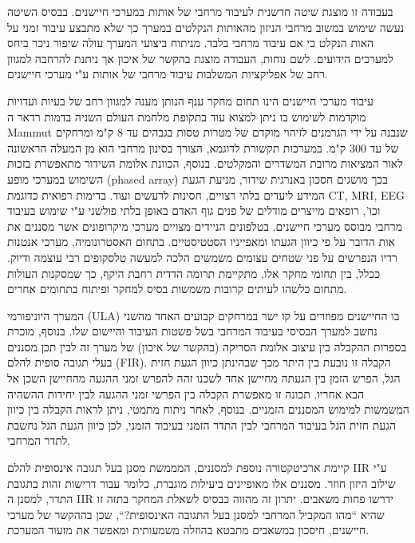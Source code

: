 בעבודה זו מוצגת שיטה חדשנית לעיבוד מרחבי של אותות במערכי חיישנים.
בבסיס השיטה נעשה שימוש במשוב מרחבי הניזון מהאותות הנקלטים במערך כך שלא מתבצע עיבוד זמני על האות הנקלט כי אם עיבוד מרחבי בלבד.
מניתוח ביצועי המערך עולה שיפור ניכר ביחס למערכים הידועים.
לשם נוחות, העבודה מוצגת בהקשר של איכון אך ניתנת להרחבה למגוון רחב של אפליקציות המשלבות עיבוד מרחבי של אותות ע"י מערכי חיישנים. 
\par
עיבוד מערכי חיישנים הינו תחום מחקר ענף הנותן מענה למגוון רחב של בעיות ועדויות מוקדמות לשימוש בו ניתן למצוא עוד בתקופת מלחמת העולם השניה בדמות רדאר ה
\textenglish{Mammut}
שנבנה על ידי הגרמנים לזיהוי מוקדם של מטרות טסות בגבהים עד 8 ק"מ ומרחקים של עד 300 ק"מ.
במערכות תקשורת לדוגמא, הצורך בסינון מרחבי הוא מן המעלה הראשונה לאור המציאות מרובת המשדרים והמקלטים. בנוסף, הכוונת אלומת השידור מתאפשרת בזכות השימוש במערכי מופע
\textenglish{(phased array)}
בכך מושגים חסכון באנרגית שידור, מניעת הגעת המידע ליעדים בלתי רצויים, חסינות לרעשים ועוד.
בדימות רפואית כדוגמת 
\textenglish{CT, MRI, EEG}
וכו', רופאים מייצרים מודלים של פנים גוף האדם באופן בלתי פולשני ע"י שימוש בעיבוד מרחבי מבוסס מערכי חיישנים.
בטלפונים הניידים מצויים מערכי מיקרופונים אשר מסננים את אות הדובר על פי כיוון הגעתו ומאפייניו הסטטיסטיים.
בתחום האסטרונומיה, מערכי אנטנות רדיו הנפרשים על פני שטחים עצומים משמשים הלכה למעשה טלסקופים רבי עוצמה ודיוק.
ככלל, בין תחומי מחקר אלו, מתקיימת תרומה הדדית רחבת היקף, כך שמסקנות העולות מתחום כלשהו לעיתים קרובות משמשות בסיס למחקר ופיתוח בתחומים אחרים.
\par
המערך היוניפורמי
\textenglish{(ULA)}
בו החיישנים מפוזרים על קו ישר במרחקים קבועים האחד מהשני נחשב למערך הבסיסי בעיבוד המרחבי בשל פשטות העיבוד והיישום שלו.
בנוסף, מוכרת בספרות ההקבלה בין עיצוב אלומת הסריקה (בהקשר של איכון) של מערך זה לבין תכן מסננים בעלי תגובה סופית להלם
\textenglish{(FIR)}.
הקבלה זו נובעת בין היתר מכך שבהינתן כיוון הגעת חזית הגל, הפרש הזמן בין הגעתה מחיישן אחד לשכנו זהה להפרש זמני ההגעה מהחיישן השכן אל הבא אחריו. תכונה זו מאפשרת הקבלה בין הפרשי זמני ההגעה לבין יחידות ההשהיה המשמשות למימוש המסננים הזמניים.
בנוסף, לאחר ניתוח מתמטי, ניתן לראות הקבלה בין כיוון הגעת חזית הגל בעיבוד המרחבי לבין התדר הזמני בעיבוד הזמני, לכן כיוון הגעת הגל נחשבת לתדר המרחבי.
\par
קיימת ארכיטקטורה נוספת למסננים, המממשת מסנן בעל תגובה אינסופית להלם 
\textenglish{IIR}
ע"י שילוב היזון חוזר.
מסננים אלו מאופיינים ביעילות מוגברת, כלומר עבור דרישות זהות בתגובת התדר, למסנן ה
\textenglish{IIR}
ידרשו פחות משאבים.
יתרון זה מהווה כבסיס לשאלת המחקר בתזה זו שהיא 
``מהו המקביל המרחבי למסנן בעל התגובה האינסופית?``, שכן בההקשר של מערכי חיישנים, חיסכון במשאבים מתבטא בהוזלה משמעותית ומאפשר את מזעור המערכת.
